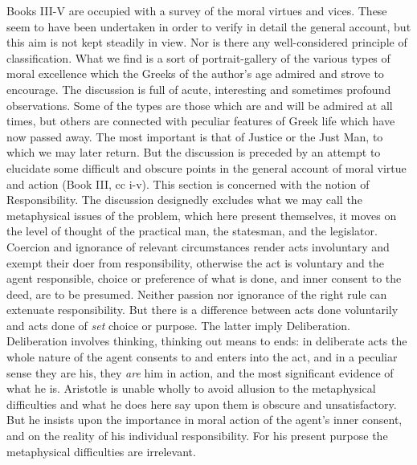 Books III-V are occupied with a survey of the moral virtues and vices. These
seem to have been undertaken in order to verify in detail the general account,
but this aim is not kept steadily in view. Nor is there any well-considered
principle of classification. What we find is a sort of portrait-gallery of the
various types of moral excellence which the Greeks of the author’s age
admired and strove to encourage. The discussion is full of acute, interesting
and sometimes profound observations. Some of the types are those which are and
will be admired at all times, but others are connected with peculiar features
of Greek life which have now passed away. The most important is that of Justice
or the Just Man, to which we may later return. But the discussion is preceded
by an attempt to elucidate some difficult and obscure points in the general
account of moral virtue and action (Book III, cc i-v). This section is
concerned with the notion of Responsibility. The discussion designedly excludes
what we may call the metaphysical issues of the problem, which here present
themselves, it moves on the level of thought of the practical man, the
statesman, and the legislator. Coercion and ignorance of relevant circumstances
render acts involuntary and exempt their doer from responsibility, otherwise
the act is voluntary and the agent responsible, choice or preference of what is
done, and inner consent to the deed, are to be presumed. Neither passion nor
ignorance of the right rule can extenuate responsibility. But there is a
difference between acts done voluntarily and acts done of \emph{set} choice or
purpose. The latter imply Deliberation. Deliberation involves thinking,
thinking out means to ends: in deliberate acts the whole nature of the agent
consents to and enters into the act, and in a peculiar sense they are his, they
\emph{are} him in action, and the most significant evidence of what he is.
Aristotle is unable wholly to avoid allusion to the metaphysical difficulties
and what he does here say upon them is obscure and unsatisfactory. But he
insists upon the importance in moral action of the agent’s inner consent,
and on the reality of his individual responsibility. For his present purpose
the metaphysical difficulties are irrelevant.

